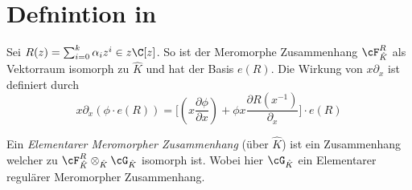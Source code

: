 \section{Defnintion in \cite{sabbah_cimpa90}}
\begin{comment}
in \cite{sabbah_cimpa90} Teil 5.4.4 Seite 34
\end{comment}
\begin{defn}
Sei $R(z)=\sum_{i=0}^k\alpha_iz^i\in z\C[z]$.
So ist der Meromorphe Zusammenhang $\cF_{\hat K}^R$ als Vektorraum isomorph zu
$\hat K$ und hat der Basis $e(R)$.
Die Wirkung von $x\partial_x$ ist definiert durch
\[
x\partial_x(\phi\cdot e(R))=\Big[ (x\frac{\partial \phi}{\partial x}) 
  +\phi x \frac{\partial R(x^{-1})}{\partial_x} \Big]\cdot e(R)
\]
\begin{comment}
This means that $e(R)$ plays the role of $\exp R(x^{-1})$.
\end{comment}
\end{defn}
\begin{defn}
Ein \emph{Elementarer Meromorpher Zusammenhang} (über $\hat K$) ist ein Zusammenhang
welcher zu 
$\cF_{\hat K}^R\otimes_{\hat K} \cG_{\hat K}$
isomorph ist. Wobei hier $\cG_{\hat K}$ ein Elementarer regulärer Meromorpher
Zusammenhang.
\end{defn}

